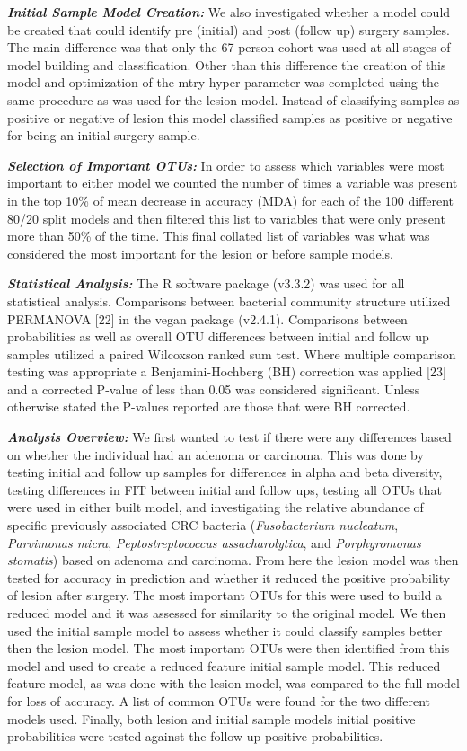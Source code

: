 \documentclass[12pt,]{article}
\begin{document}
\textbf{\emph{Initial Sample Model Creation:}} We also investigated
whether a model could be created that could identify pre (initial) and
post (follow up) surgery samples. The main difference was that only the
67-person cohort was used at all stages of model building and
classification. Other than this difference the creation of this model
and optimization of the mtry hyper-parameter was completed using the
same procedure as was used for the lesion model. Instead of classifying
samples as positive or negative of lesion this model classified samples
as positive or negative for being an initial surgery sample.

\textbf{\emph{Selection of Important OTUs:}} In order to assess which
variables were most important to either model we counted the number of
times a variable was present in the top 10\% of mean decrease in
accuracy (MDA) for each of the 100 different 80/20 split models and then
filtered this list to variables that were only present more than 50\% of
the time. This final collated list of variables was what was considered
the most important for the lesion or before sample models.

\textbf{\emph{Statistical Analysis:}} The R software package (v3.3.2)
was used for all statistical analysis. Comparisons between bacterial
community structure utilized PERMANOVA {[}22{]} in the vegan package
(v2.4.1). Comparisons between probabilities as well as overall OTU
differences between initial and follow up samples utilized a paired
Wilcoxson ranked sum test. Where multiple comparison testing was
appropriate a Benjamini-Hochberg (BH) correction was applied {[}23{]}
and a corrected P-value of less than 0.05 was considered significant.
Unless otherwise stated the P-values reported are those that were BH
corrected.

\textbf{\emph{Analysis Overview:}} We first wanted to test if there were
any differences based on whether the individual had an adenoma or
carcinoma. This was done by testing initial and follow up samples for
differences in alpha and beta diversity, testing differences in FIT
between initial and follow ups, testing all OTUs that were used in
either built model, and investigating the relative abundance of specific
previously associated CRC bacteria (\emph{Fusobacterium nucleatum},
\emph{Parvimonas micra}, \emph{Peptostreptococcus assacharolytica}, and
\emph{Porphyromonas stomatis}) based on adenoma and carcinoma. From here
the lesion model was then tested for accuracy in prediction and whether
it reduced the positive probability of lesion after surgery. The most
important OTUs for this were used to build a reduced model and it was
assessed for similarity to the original model. We then used the initial
sample model to assess whether it could classify samples better then the
lesion model. The most important OTUs were then identified from this
model and used to create a reduced feature initial sample model. This
reduced feature model, as was done with the lesion model, was compared
to the full model for loss of accuracy. A list of common OTUs were found
for the two different models used. Finally, both lesion and initial
sample models initial positive probabilities were tested against the
follow up positive probabilities.
\end{document}
